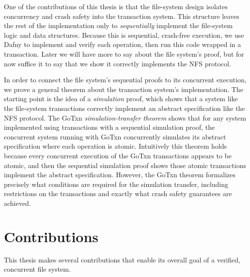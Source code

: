 One of the contributions of this thesis is that the file-system design isolates
concurrency and crash safety into the transaction system. This structure leaves
the rest of the implementation only to \emph{sequentially} implement the
file-system logic and data structures. Because this is sequential, crash-free
execution, we use Dafny to implement and verify each operation, then run this
code wrapped in a transaction. Later we will have more to say about the file
system's proof, but for now suffice it to say that we show it correctly
implements the NFS protocol.

In order to connect the file system's sequential proofs to its concurrent
execution, we prove a general theorem about the transaction system's
implementation. The starting point is the idea of a \emph{simulation} proof,
which shows that a system like the file-system transactions correctly implement an
abstract specification like the NFS protocol. The GoTxn
\emph{simulation-transfer theorem} shows that for any system implemented using
transactions with a sequential simulation proof, the concurrent system running
with GoTxn concurrently simulates its abstract specification where each
operation is atomic. Intuitively this theorem holds because every concurrent
execution of the GoTxn transactions appears to be atomic, and then the
sequential simulation proof shows those atomic transactions implement the
abstract specification. However, the GoTxn theorem formalizes precisely what
conditions are required for the simulation transfer, including restrictions on
the transactions and exactly what crash safety guarantees are achieved.

\section{Contributions}

This thesis makes several contributions that enable its overall goal of a
verified, concurrent file system.

